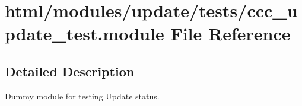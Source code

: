\hypertarget{ccc__update__test_8module}{
\section{html/modules/update/tests/ccc\_\-update\_\-test.module File Reference}
\label{ccc__update__test_8module}
}


\subsection{Detailed Description}
Dummy module for testing Update status. 